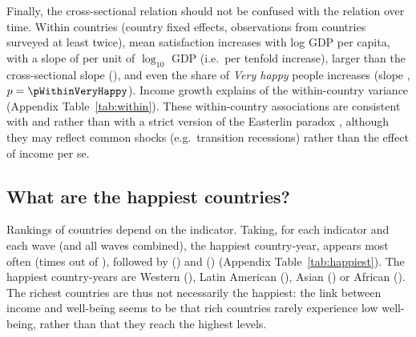 Finally, the cross-sectional relation should not be confused with the relation over time. Within countries (country fixed effects, \nWithin observations from countries surveyed at least twice), mean satisfaction increases with log GDP per capita, with a slope of \withinSlopeSatisfiedMean per unit of $\log_{10}$ GDP (i.e.\ per tenfold increase), larger than the cross-sectional slope (\crossSlopeSatisfiedMean), and even the share of \textit{Very happy} people increases (slope \withinSlopeVeryHappy, $p = \pWithinVeryHappy$). Income growth explains \withinRtwoSatisfiedMean of the within-country variance (Appendix Table~\ref{tab:within}). These within-country associations are consistent with \citet{stevenson_economic_2008} and \citet{sacks_new_2012} rather than with a strict version of the Easterlin paradox \citep{easterlin_does_1974,easterlin_happiness_2010}, although they may reflect common shocks (e.g.\ transition recessions) rather than the effect of income per se.

\subsection{What are the happiest countries?}\label{subsec:happiest}

Rankings of countries depend on the indicator. Taking, for each indicator and each wave (and all waves combined), the happiest country-year, \happiestFirst appears most often (\happiestFirstN times out of \nHappiestCells), followed by \happiestSecond (\happiestSecondN) and \happiestThird (\happiestThirdN) (Appendix Table~\ref{tab:happiest}). The happiest country-years are Western (\happiestRegionWestern), Latin American (\happiestRegionLatinAmerica), Asian (\happiestRegionAsia) or African (\happiestRegionAfrica). The richest countries are thus not necessarily the happiest: the link between income and well-being seems to be that rich countries rarely experience low well-being, rather than that they reach the highest levels.
